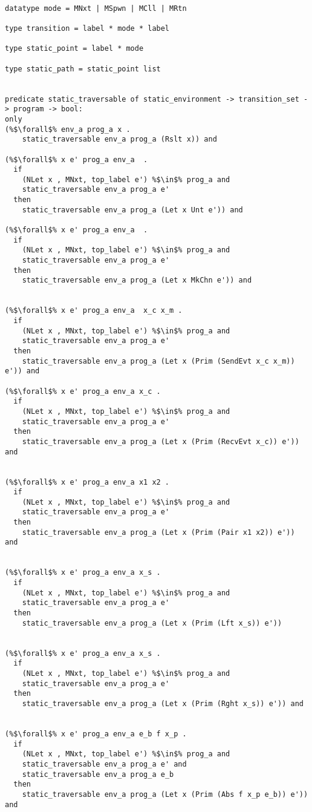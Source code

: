 \documentclass{article}
\begin{document}
\begin{lstlisting}[language=logic, style=codestyle1, escapechar=\%]

datatype mode = MNxt | MSpwn | MCll | MRtn

type transition = label * mode * label

type static_point = label * mode

type static_path = static_point list


predicate static_traversable of static_environment -> transition_set -> program -> bool:
only
(%$\forall$% env_a prog_a x .
    static_traversable env_a prog_a (Rslt x)) and

(%$\forall$% x e' prog_a env_a  .
  if
    (NLet x , MNxt, top_label e') %$\in$% prog_a and
    static_traversable env_a prog_a e'
  then
    static_traversable env_a prog_a (Let x Unt e')) and

(%$\forall$% x e' prog_a env_a  .
  if
    (NLet x , MNxt, top_label e') %$\in$% prog_a and
    static_traversable env_a prog_a e'
  then
    static_traversable env_a prog_a (Let x MkChn e')) and


(%$\forall$% x e' prog_a env_a  x_c x_m .
  if
    (NLet x , MNxt, top_label e') %$\in$% prog_a and
    static_traversable env_a prog_a e'
  then
    static_traversable env_a prog_a (Let x (Prim (SendEvt x_c x_m)) e')) and

(%$\forall$% x e' prog_a env_a x_c .
  if
    (NLet x , MNxt, top_label e') %$\in$% prog_a and
    static_traversable env_a prog_a e'
  then
    static_traversable env_a prog_a (Let x (Prim (RecvEvt x_c)) e')) and


(%$\forall$% x e' prog_a env_a x1 x2 .
  if
    (NLet x , MNxt, top_label e') %$\in$% prog_a and
    static_traversable env_a prog_a e'
  then
    static_traversable env_a prog_a (Let x (Prim (Pair x1 x2)) e')) and


(%$\forall$% x e' prog_a env_a x_s .
  if
    (NLet x , MNxt, top_label e') %$\in$% prog_a and
    static_traversable env_a prog_a e'
  then
    static_traversable env_a prog_a (Let x (Prim (Lft x_s)) e'))


(%$\forall$% x e' prog_a env_a x_s .
  if
    (NLet x , MNxt, top_label e') %$\in$% prog_a and
    static_traversable env_a prog_a e'
  then
    static_traversable env_a prog_a (Let x (Prim (Rght x_s)) e')) and


(%$\forall$% x e' prog_a env_a e_b f x_p .
  if
    (NLet x , MNxt, top_label e') %$\in$% prog_a and
    static_traversable env_a prog_a e' and
    static_traversable env_a prog_a e_b
  then
    static_traversable env_a prog_a (Let x (Prim (Abs f x_p e_b)) e')) and


\end{lstlisting}
\end{document}
